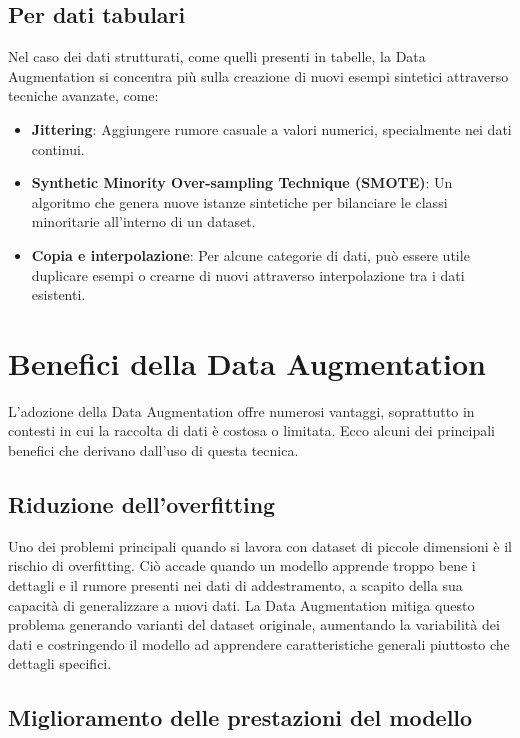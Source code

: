 \subsection{Per dati tabulari}
Nel caso dei dati strutturati, come quelli presenti in tabelle, la Data Augmentation si concentra più sulla creazione di nuovi esempi sintetici attraverso tecniche avanzate, come:

\begin{itemize}
    \item \textbf{Jittering}: Aggiungere rumore casuale a valori numerici, specialmente nei dati continui.
    \item \textbf{Synthetic Minority Over-sampling Technique (SMOTE)}: Un algoritmo che genera nuove istanze sintetiche per bilanciare le classi minoritarie all'interno di un dataset.
    \item \textbf{Copia e interpolazione}: Per alcune categorie di dati, può essere utile duplicare esempi o crearne di nuovi attraverso interpolazione tra i dati esistenti.
\end{itemize}

\section{Benefici della Data Augmentation}

L'adozione della Data Augmentation offre numerosi vantaggi, soprattutto in contesti in cui la raccolta di dati è costosa o limitata. Ecco alcuni dei principali benefici che derivano dall'uso di questa tecnica.

\subsection{Riduzione dell'overfitting}

Uno dei problemi principali quando si lavora con dataset di piccole dimensioni è il rischio di overfitting. Ciò accade quando un modello apprende troppo bene i dettagli e il rumore presenti nei dati di addestramento, a scapito della sua capacità di generalizzare a nuovi dati. La Data Augmentation mitiga questo problema generando varianti del dataset originale, aumentando la variabilità dei dati e costringendo il modello ad apprendere caratteristiche generali piuttosto che dettagli specifici.

\subsection{Miglioramento delle prestazioni del modello}

